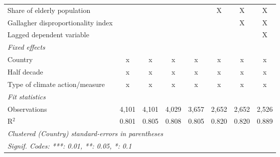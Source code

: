\begin{tabular}{lccccccc}
   Share of elderly population                                             &               &               &               &              & X             & X            & X\\  
   Gallagher disproportionality index                                      &               &               &               &              &               & X            & X\\  
   Lagged dependent variable                                               &               &               &               &              &               &              & X\\  
   \emph{Fixed effects}\\
   Country                                                                 & x             & x             & x             & x            & x             & x            & x\\  
   Half decade                                                             & x             & x             & x             & x            & x             & x            & x\\  
   Type of climate action/measure                                          & x             & x             & x             & x            & x             & x            & x\\  
   \midrule \emph{Fit statistics}\\
   Observations                                                            & 4,101         & 4,101         & 4,029         & 3,657        & 2,652         & 2,652        & 2,526\\  
   R$^2$                                                                   & 0.801         & 0.805         & 0.808         & 0.805        & 0.820         & 0.820        & 0.889\\  
   \midrule
   \multicolumn{8}{l}{\emph{Clustered (Country) standard-errors in parentheses}}\\
   \multicolumn{8}{l}{\emph{Signif. Codes: ***: 0.01, **: 0.05, *: 0.1}}\\
\end{tabular}
\par\endgroup


